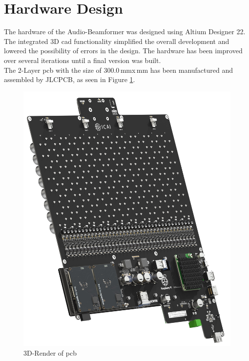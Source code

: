 \newpage
\section{Hardware Design}
The hardware of the Audio-Beamformer was designed using Altium Designer 22. The integrated 3D \acrshort{cad} functionality simplified the overall development and lowered the possibility of errors in the design.
The hardware has been improved over several iterations until a final version was built.\\
The 2-Layer \acrfull{pcb} with the size of 300.0\,mm\;x\,mm has been manufactured and assembled by JLCPCB, as seen in Figure \ref{fig:pcb_render}.

\begin{figure}[h!]
	\centering
	\includegraphics[width=14cm]{images/4_Design/Hardware/Audio-Beamformer_PCB.jpg}
	\vspace{-0.2cm}
    \caption{3D-Render of \acrshort{pcb}}
    \label{fig:pcb_render}
\end{figure}
\newpage

